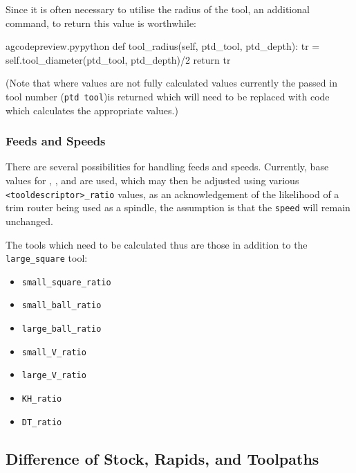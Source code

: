 \documentclass{ltxdoc}
\begin{document}
Since it is often necessary to utilise the radius of the tool, an additional command,  to return this value is worthwhile:
 
\lstset{firstnumber=\thegcpy}
\begin{writecode}{a}{gcodepreview.py}{python}
    def tool_radius(self, ptd_tool, ptd_depth):
        tr = self.tool_diameter(ptd_tool, ptd_depth)/2
        return tr

\end{writecode}
\addtocounter{gcpy}{4}
 
\noindent (Note that where values are not fully calculated values currently the passed in tool number (\verb|ptd tool|)is returned which will need to be replaced with code which calculates the appropriate values.)

\subsubsection{Feeds and Speeds}

There are several possibilities for handling feeds and speeds. Currently, base values for , , and  are used, which may then be adjusted using various \verb|<tooldescriptor>_ratio| values, as an acknowledgement of the likelihood of a trim router being used as a spindle, the assumption is that the \texttt{speed} will remain unchanged.


The tools which need to be calculated thus are those in addition to the \verb|large_square| tool:

\begin{itemize}
\item \verb|small_square_ratio|
\item \verb|small_ball_ratio|
\item \verb|large_ball_ratio|
\item \verb|small_V_ratio|
\item \verb|large_V_ratio|
\item \verb|KH_ratio|
\item \verb|DT_ratio|
\end{itemize}

\subsection{Difference of Stock, Rapids, and Toolpaths}
\end{document}
